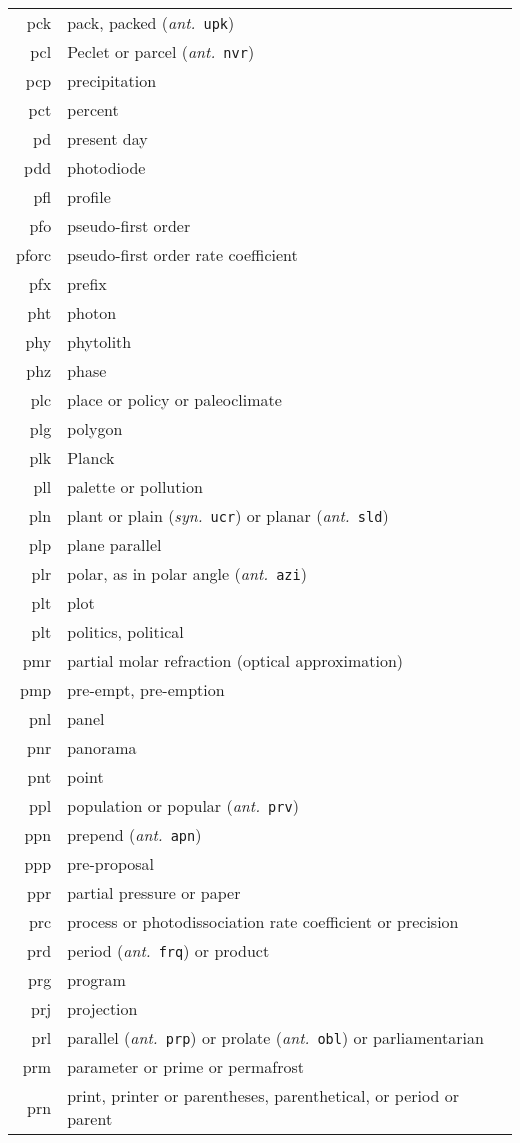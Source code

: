 \documentclass[12pt,twoside]{article}
\newcommand{\ant}[1]{(\textit{ant.}~\texttt{#1})}
\newcommand{\syn}[1]{(\textit{syn.}~\texttt{#1})}
\begin{document}
\begin{longtable}[>{\bfseries}l]{>{\ttfamily}r l}
pck & pack, packed \ant{upk} \\
pcl & Peclet or parcel \ant{nvr} \\
pcp & precipitation \\
pct & percent \\
pd & present day \\
pdd & photodiode \\
pfl & profile \\
pfo & pseudo-first order \\
pforc & pseudo-first order rate coefficient \\
pfx & prefix \\
pht & photon \\
phy & phytolith \\
phz & phase \\
plc & place or policy or paleoclimate \\
plg & polygon \\
plk & Planck \\
pll & palette or pollution \\
pln & plant or plain \syn{ucr} or planar \ant{sld} \\
plp & plane parallel \\
plr & polar, as in polar angle \ant{azi} \\
plt & plot \\
plt & politics, political \\
pmr & partial molar refraction (optical approximation) \\
pmp & pre-empt, pre-emption \\
pnl & panel \\
pnr & panorama \\
pnt & point \\
ppl & population or popular \ant{prv} \\
ppn & prepend \ant{apn} \\
ppp & pre-proposal \\
ppr & partial pressure or paper \\
prc & process or photodissociation rate coefficient or precision \\
prd & period \ant{frq} or product \\
prg & program \\
prj & projection \\
prl & parallel \ant{prp} or prolate \ant{obl} or parliamentarian \\
prm & parameter or prime or permafrost \\
prn & print, printer or parentheses, parenthetical, or period or parent \\

\end{longtable}
\end{document}

